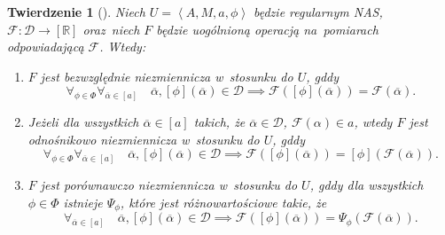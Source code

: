 \documentclass[12pt,a4paper]{report}
\newtheorem{tw}[definition]{Twierdzenie}
\newcommand{\domkniecie}[1]{\left[ {#1} \right] }
\newcommand{\tuple}[1]{\left\langle {#1} \right\rangle}
\begin{document}
\begin{tw}[{\citep[Tw. 2]{adams1965theory}}]
Niech $U=\tuple{A,M,a,\phi}$ będzie regularnym NAS, $\mathcal{F}:\mathcal{D}\to \domkniecie{\mathbb{R}}$ oraz~niech $F$ będzie uogólnioną operacją na~pomiarach odpowiadającą $\mathcal{F}$. Wtedy:
\begin{enumerate}
\item
$F$ jest bezwzględnie niezmiennicza w~stosunku do $U$, gddy
$$
\forall_{\phi \in \Phi} \forall_{\overline{\alpha} \in \domkniecie{a}} \quad \overline{\alpha}, \domkniecie{\phi}(\overline{\alpha}) \in \mathcal{D} \implies \mathcal{F}(\domkniecie{\phi}(\overline{\alpha}))=\mathcal{F}(\overline{\alpha}).
$$
\item
Jeżeli dla wszystkich $\overline{\alpha} \in \domkniecie{a}$ takich, że $\overline{\alpha} \in \mathcal{D}$, $\mathcal{F}(\alpha)\in a$, wtedy $F$ jest odnośnikowo niezmiennicza w~stosunku do $U$, gddy
\begin{equation*}
\forall_{\phi \in \Phi} \forall_{\overline{\alpha} \in \domkniecie{a}} \quad \overline{\alpha}, \domkniecie{\phi}(\overline{\alpha}) \in \mathcal{D} \implies \mathcal{F}(\domkniecie{\phi}(\overline{\alpha}))=\domkniecie{\phi}(\mathcal{F}(\overline{\alpha})).
\end{equation*}
\item
$F$ jest porównawczo niezmiennicza w~stosunku do $U$, gddy dla wszystkich $\phi \in \Phi$ istnieje $\Psi_{\phi}$, które jest różnowartościowe takie, że
$$
 \forall_{\overline{\alpha} \in \domkniecie{a}} \quad \overline{\alpha}, \domkniecie{\phi}(\overline{\alpha}) \in \mathcal{D} \implies \mathcal{F}(\domkniecie{\phi}(\overline{\alpha}))=\Psi_{\phi}(\mathcal{F}(\overline{\alpha})).
$$
\end{enumerate}
\end{tw}
\end{document}
